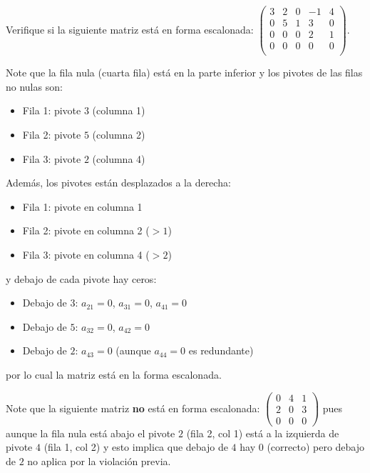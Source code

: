 \begin{example} Verifique si la siguiente matriz está en forma escalonada:
\( \begin{pmatrix}
\boxed{3} & 2 & 0 & -1 & 4 \\
0 & \boxed{5} & 1 & 3 & 0 \\
0 & 0 & 0 & \boxed{2} & 1 \\
0 & 0 & 0 & 0 & 0 \\
\end{pmatrix}
\).

\begin{myproof} Note que la fila nula (cuarta fila) está en la parte inferior y los pivotes de las filas no nulas son: 
  \begin{itemize}
  \item Fila 1: pivote $\boxed{3}$ (columna 1)
  \item Fila 2: pivote $\boxed{5}$ (columna 2)
  \item Fila 3: pivote $\boxed{2}$ (columna 4)
  \end{itemize}
  Además, los pivotes están desplazados a la derecha:
  \begin{itemize}
  \item Fila 1: pivote en columna 1
  \item Fila 2: pivote en columna 2 ($>1$)
  \item Fila 3: pivote en columna 4 ($>2$)
  \end{itemize}
  y debajo de cada pivote hay ceros:
  \begin{itemize}
  \item Debajo de $\boxed{3}$: $a_{21}=0$, $a_{31}=0$, $a_{41}=0$
  \item Debajo de $\boxed{5}$: $a_{32}=0$, $a_{42}=0$
  \item Debajo de $\boxed{2}$: $a_{43}=0$ (aunque $a_{44}=0$ es redundante)
  \end{itemize}
por lo cual la matriz está en la forma escalonada. 

Note que la siguiente matriz \textbf{no} está en forma escalonada: \( \begin{pmatrix}
0 & \boxed{4} & 1 \\
\boxed{2} & 0 & 3 \\
0 & 0 & 0 
\end{pmatrix}
\) pues aunque la fila nula está abajo el  pivote $\boxed{2}$ (fila 2, col 1) está a la izquierda de pivote $\boxed{4}$ (fila 1, col 2) y esto implica que debajo de $\boxed{4}$ hay $0$ (correcto) pero debajo de $\boxed{2}$ no aplica por la violación previa.
\end{myproof}



\end{example}

